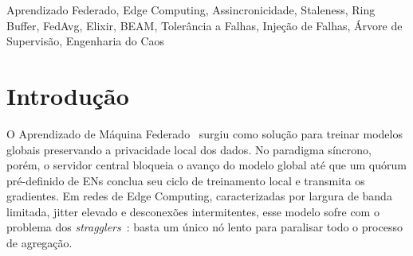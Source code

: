 \documentclass[conference,a4paper]{IEEEtran}
\begin{document}
\begin{abstract}
não revela nenhuma interação problemática entre os mecanismos de correção.
A correção, porém, não elimina toda a resiliência residual. Um terceiro
experimento mostra que, se o próprio processo herdeiro ETS morrer antes do
processo que ele protege, o vínculo do \texttt{:heir} fica órfão e
\textbf{100\% do conteúdo é perdido}; encadear um segundo
herdeiro não fecharia essa janela, apenas a deslocaria um nível pela
mesma coincidência de timing. A correção estrutural aplicada, posse
invertida (um processo trivial, sem lógica de domínio, possui a tabela
permanentemente em vez de repassá-la) combinada, para o modelo global,
com checkpoint em disco, fecha esse gap por completo para o estado
mais crítico do sistema
(\textbf{\statExpRFiveModelOwnerDeadPct{}\%} de perda ao matar o dono do
modelo, contra 100\% antes), mas deixa um resíduo aceito e caracterizado
para o buffer de gradientes
(\textbf{\statExpRFiveBufferOwnerDeadPct{}\%} de perda ao matar seu dono,
sem persistência em disco): um trade-off explícito, não uma omissão.
Uma validação adicional em rede real (nós BEAM
distribuídos entre containers Docker conectados por TCP/IP genuíno, não
\texttt{Process.sleep}) reproduz o mesmo speedup em ordem de grandeza
($\statExpADistSpeedup$ real vs.\ $\statExpASpeedup$ simulado),
confirmando que a simulação de latência usada nos demais experimentos não
mascara os resultados de resiliência. A contribuição central deste
trabalho não é uma nova técnica de agregação, mas uma metodologia de
verificação, via injeção de falhas sistemática, com evidência
quantitativa antes/depois, em vez de argumento de design, que expôs
gaps reais num sistema que já citava sua plataforma (BEAM/OTP) como
justificativa de resiliência.
\end{abstract}

\begin{IEEEkeywords}
Aprendizado Federado, Edge Computing, Assincronicidade, Staleness,
Ring Buffer, FedAvg, Elixir, BEAM, Tolerância a Falhas, Injeção de Falhas,
Árvore de Supervisão, Engenharia do Caos
\end{IEEEkeywords}

\section{Introdução}

O Aprendizado de Máquina Federado~\cite{mcmahan2017} surgiu como solução
para treinar modelos globais preservando a privacidade local dos dados.
No paradigma síncrono, porém, o servidor central bloqueia o avanço do modelo
global até que um quórum pré-definido de ENs conclua seu ciclo de treinamento
local e transmita os gradientes. Em redes de Edge Computing, caracterizadas
por largura de banda limitada, jitter elevado e desconexões intermitentes,
esse modelo sofre com o problema dos \textit{stragglers}~\cite{li2020survey}:
basta um único nó lento para paralisar todo o processo de agregação.
\end{document}
